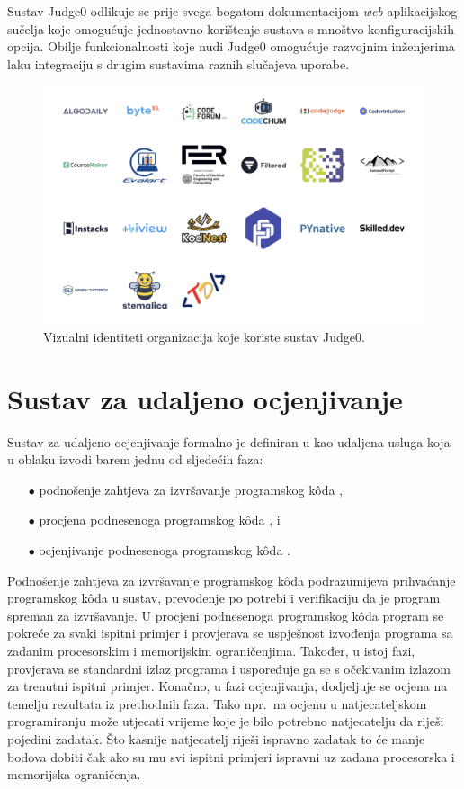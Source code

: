 \documentclass[times, utf8, diplomski]{fer}
\begin{document}
Sustav Judge0 odlikuje se prije svega bogatom dokumentacijom \textit{web} aplikacijskog sučelja koje omogućuje jednostavno korištenje sustava s mnoštvo konfiguracijskih opcija. Obilje funkcionalnosti koje nudi Judge0 omogućuje razvojnim inženjerima laku integraciju s drugim sustavima raznih slučajeva uporabe.

\begin{figure}[htb]
	\centering
	\includegraphics[width=\textwidth]{images/Judge0 Clients.png}
	\caption{
	    Vizualni identiteti organizacija koje koriste sustav Judge0. \citep{Judge0Web}
	}
	\label{fig:judge0-clients}
\end{figure}

\pagebreak

\section{Sustav za udaljeno ocjenjivanje}
Sustav za udaljeno ocjenjivanje formalno je definiran u \citep{wasik2018survey} kao udaljena usluga  koja u oblaku  izvodi barem jednu od sljedećih faza:
\begin{itemize}
    \item[$\bullet$] podnošenje zahtjeva za izvršavanje programskog kôda ,
    \item[$\bullet$] procjena podnesenoga programskog kôda , i
    \item[$\bullet$] ocjenjivanje podnesenoga programskog kôda .
\end{itemize}

Podnošenje zahtjeva za izvršavanje programskog kôda podrazumijeva prihvaćanje programskog kôda u sustav, prevođenje po potrebi i verifikaciju da je program spreman za izvršavanje. U procjeni podnesenoga programskog kôda program se pokreće za svaki ispitni primjer i provjerava se uspješnost izvođenja programa sa zadanim procesorskim i memorijskim ograničenjima. Također, u istoj fazi, provjerava se standardni izlaz programa i uspoređuje ga se s očekivanim izlazom za trenutni ispitni primjer. Konačno, u fazi ocjenjivanja, dodjeljuje se ocjena na temelju rezultata iz prethodnih faza. Tako npr.\ na ocjenu u natjecateljskom programiranju može utjecati vrijeme koje je bilo potrebno natjecatelju da riješi pojedini zadatak. Što kasnije natjecatelj riješi ispravno zadatak to će manje bodova dobiti čak ako su mu svi ispitni primjeri ispravni uz zadana procesorska i memorijska ograničenja.
\end{document}

